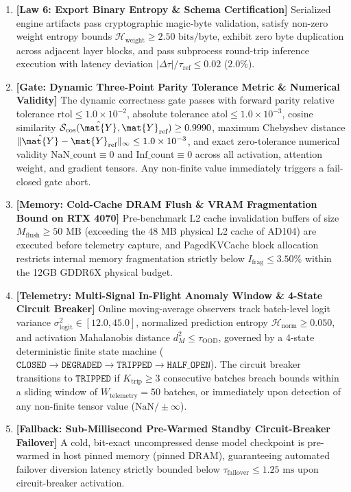 \begin{enumerate}
    \item \textbf{[Law 6: Export Binary Entropy \& Schema Certification]} Serialized engine artifacts pass cryptographic magic-byte validation, satisfy non-zero weight entropy bounds $\mathcal{H}_{\text{weight}} \ge 2.50\text{ bits/byte}$, exhibit zero byte duplication across adjacent layer blocks, and pass subprocess round-trip inference execution with latency deviation $|\Delta \tau| / \tau_{\text{ref}} \le 0.02$ ($2.0\%$).
    \item \textbf{[Gate: Dynamic Three-Point Parity Tolerance Metric \& Numerical Validity]} The dynamic correctness gate passes with forward parity relative tolerance $\text{rtol} \le 1.0 \times 10^{-2}$, absolute tolerance $\text{atol} \le 1.0 \times 10^{-3}$, cosine similarity $\mathcal{S}_{\cos}(\hat{\mat{Y}}, \mat{Y}_{\text{ref}}) \ge 0.9990$, maximum Chebyshev distance $\|\hat{\mat{Y}} - \mat{Y}_{\text{ref}}\|_\infty \le 1.0 \times 10^{-3}$, and exact zero-tolerance numerical validity $\text{NaN\_count} \equiv 0$ and $\text{Inf\_count} \equiv 0$ across all activation, attention weight, and gradient tensors. Any non-finite value immediately triggers a fail-closed gate abort.
    \item \textbf{[Memory: Cold-Cache DRAM Flush \& VRAM Fragmentation Bound on RTX 4070]} Pre-benchmark L2 cache invalidation buffers of size $M_{\text{flush}} \ge 50\text{ MB}$ (exceeding the $48\text{ MB}$ physical L2 cache of AD104) are executed before telemetry capture, and PagedKVCache block allocation restricts internal memory fragmentation strictly below $I_{\text{frag}} \le 3.50\%$ within the 12GB GDDR6X physical budget.
    \item \textbf{[Telemetry: Multi-Signal In-Flight Anomaly Window \& 4-State Circuit Breaker]} Online moving-average observers track batch-level logit variance $\sigma_{\text{logit}}^2 \in [12.0, 45.0]$, normalized prediction entropy $\mathcal{H}_{\text{norm}} \ge 0.050$, and activation Mahalanobis distance $d_M^2 \le \tau_{\text{OOD}}$, governed by a 4-state deterministic finite state machine ($\mathtt{CLOSED} \to \mathtt{DEGRADED} \to \mathtt{TRIPPED} \to \mathtt{HALF\_OPEN}$). The circuit breaker transitions to $\mathtt{TRIPPED}$ if $K_{\text{trip}} \ge 3$ consecutive batches breach bounds within a sliding window of $W_{\text{telemetry}} = 50$ batches, or immediately upon detection of any non-finite tensor value ($\mathrm{NaN}/\pm\infty$).
    \item \textbf{[Fallback: Sub-Millisecond Pre-Warmed Standby Circuit-Breaker Failover]} A cold, bit-exact uncompressed dense model checkpoint is pre-warmed in host pinned memory (pinned DRAM), guaranteeing automated failover diversion latency strictly bounded below $\tau_{\text{failover}} \le 1.25\text{ ms}$ upon circuit-breaker activation.

\end{enumerate}
